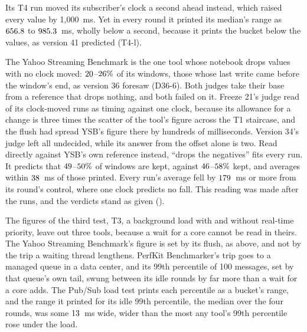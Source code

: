 \documentclass[10pt,journal,onecolumn]{IEEEtran}
\begin{document}
Its T4 run moved its subscriber's clock a second ahead instead, which raised every value by
1{,}000~ms. Yet in every round it printed its median's range as $656.8$ to
$985.3$~ms, wholly below a second, because it prints the bucket below the values, as
version 41 predicted (T4-l).

The Yahoo Streaming Benchmark is the one tool whose notebook drops values with no clock moved:
$20$--$26\%$ of its windows, those whose last write came
before the window's end, as version 36 foresaw (D36-6). Both judges take their base from a
reference that drops nothing, and both failed on it. Freeze 21's judge read
\toolsYsbOneClockWord{} of its \toolsYsbRunsWord{} clock-moved runs as timing against one clock,
because its allowance for a change is three times the scatter of the tool's figure across the T1
staircase, and the flush had spread YSB's figure there by hundreds of milliseconds. Version 34's
judge left all \toolsYsbRunsWord{} undecided, while its answer from the offset alone is two. Read
directly against YSB's own reference instead, ``drops the negatives'' fits every run. It predicts
that $49$--$50\%$ of windows are kept, against
$46$--$58\%$ kept, and averages within $38$~ms of
those printed. Every run's average fell by $179$~ms or more from its round's control,
where one clock predicts no fall. This reading was made after the runs, and the verdicts stand as
given ().

The figures of the third test, T3, a background load with and without real-time priority, leave
out three tools, because a wait for a core cannot be read in theirs. The Yahoo Streaming
Benchmark's figure is set by its flush, as above, and not by the trip a waiting thread lengthens.
PerfKit Benchmarker's trip goes to a managed queue in a data center, and its 99th percentile of 100
messages, set by that queue's own tail, swung between its idle rounds by far more than a wait for a
core adds. The Pub/Sub load test prints each percentile as a bucket's range, and the range it
printed for its idle 99th percentile, the median over the four rounds, was some
$13$~ms wide, wider than the most any tool's 99th percentile rose under the load.
\end{document}
